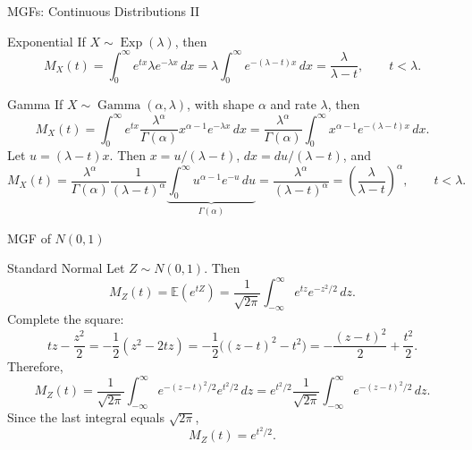 \begin{frame}{MGFs: Continuous Distributions II}

\small

\begin{keybox}{Exponential}
If \(X\sim\operatorname{Exp}(\lambda)\), then
\[
M_X(t)=\int_0^\infty e^{tx}\lambda e^{-\lambda x}\,dx
=\lambda\int_0^\infty e^{-(\lambda-t)x}\,dx
=\frac{\lambda}{\lambda-t},
\qquad t<\lambda.
\]
\end{keybox}

\begin{keybox}{Gamma}
If \(X\sim\operatorname{Gamma}(\alpha,\lambda)\), with shape \(\alpha\) and rate \(\lambda\), then
\[
M_X(t)
=
\int_0^\infty e^{tx}
\frac{\lambda^\alpha}{\Gamma(\alpha)}
x^{\alpha-1}e^{-\lambda x}\,dx
=
\frac{\lambda^\alpha}{\Gamma(\alpha)}
\int_0^\infty x^{\alpha-1}e^{-(\lambda-t)x}\,dx.
\]
Let \(u=(\lambda-t)x\). Then \(x=u/(\lambda-t)\), \(dx=du/(\lambda-t)\), and
\[
M_X(t)
=
\frac{\lambda^\alpha}{\Gamma(\alpha)}
\frac{1}{(\lambda-t)^\alpha}
\underbrace{
\int_0^\infty u^{\alpha-1}e^{-u}\,du
}_{\Gamma(\alpha)}
=
\frac{\lambda^\alpha}{(\lambda-t)^\alpha}
=
\left(\frac{\lambda}{\lambda-t}\right)^\alpha,
\qquad t<\lambda.
\]
\end{keybox}

\end{frame}

























\begin{frame}{MGF of $N(0,1)$}

\small

\begin{keybox}{Standard Normal}
Let \(Z\sim N(0,1)\). Then
\[
M_Z(t)=\mathbb{E}(e^{tZ})
=\frac1{\sqrt{2\pi}}\int_{-\infty}^{\infty}e^{tz}e^{-z^2/2}\,dz.
\]
Complete the square:
\[
tz-\frac{z^2}{2}
=
-\frac12(z^2-2tz)
=
-\frac12\bigl((z-t)^2-t^2\bigr)
=
-\frac{(z-t)^2}{2}+\frac{t^2}{2}.
\]
Therefore,
\[
M_Z(t)
=
\frac1{\sqrt{2\pi}}\int_{-\infty}^{\infty}
e^{-(z-t)^2/2}e^{t^2/2}\,dz
=
e^{t^2/2}
\frac1{\sqrt{2\pi}}\int_{-\infty}^{\infty}e^{-(z-t)^2/2}\,dz.
\]
Since the last integral equals \(\sqrt{2\pi}\),
\[
{M_Z(t)=e^{t^2/2}}.
\]
\end{keybox}

\end{frame}


















